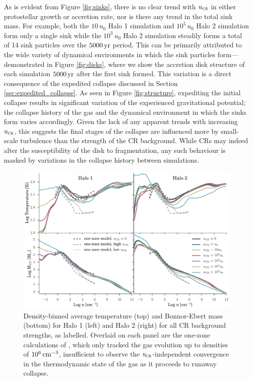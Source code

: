 \documentclass[../thesis.tex]{subfiles}
\begin{document}
As is evident from Figure \ref{fig:sinks}, there is no clear trend with ${u}_{\textsc{cr}}$ in either protostellar growth or accretion rate, nor is there any trend in the total sink mass.
For example, both the $10\,u_0$ Halo 1 simulation and $10^5\,u_0$ Halo 2 simulation form only a single sink while the $10^3\,u_0$ Halo 2 simulation steadily forms a total of 14 sink particles over the $5000\,\mathrm{yr}$ period.
This  can be primarily attributed to the wide variety of dynamical environments in which the sink particles form---demonstrated in Figure \ref{fig:disks}, where we show the accretion disk structure of each simulation $5000\,\mathrm{yr}$ after the first sink formed.
This variation is a direct consequence of the expedited collapse discussed in Section \ref{sec:expedited_collapse}. 
As seen in Figure \ref{fig:structure}, expediting the initial collapse results in significant variation of the experienced gravitational potential; the collapse history of the gas and the dynamical environment in which the sinks form varies accordingly.
Given the lack of any apparent trends with increasing ${u}_{\textsc{cr}}$, this suggests the final stages of the collapse are influenced more by small-scale turbulence than the strength of the CR background.
While CRs may indeed alter the susceptibility of the disk to fragmentation, any such behaviour is masked by variations in the collapse history between simulations.

\begin{figure}
\begin{center}
\includegraphics[width=\columnwidth]{figures/binned_T_Mbe/binned_T_Mbe}
\caption{\label{fig:Mbe}
Density-binned average temperature (top) and Bonnor-Ebert mass (bottom) for Halo 1 (left) and Halo 2 (right) for all CR background strengths, as labelled.
Overlaid on each panel are the one-zone calculations of \citet{StacyBromm2007}, which only tracked the gas evolution up to densities of $10^6\,\mathrm{cm}^{-3}$, insufficient to observe the ${u}_{\textsc{cr}}$-independent convergence in the thermodynamic state of the gas as it proceeds to runaway collapse.%
}
\end{center}
\end{figure}
\end{document}
